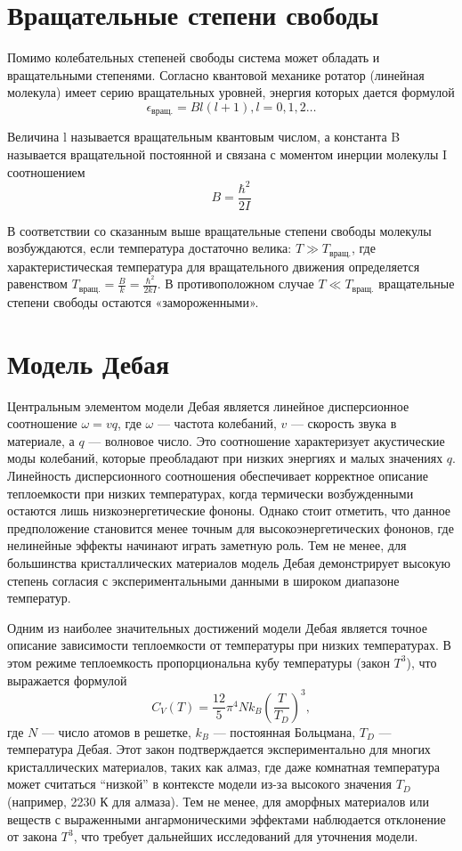 \documentclass[a4paper]{article}
\begin{document}
\section{Вращательные степени свободы}

Помимо колебательных степеней свободы система может обладать
и вращательными степенями. Согласно квантовой механике ротатор
(линейная молекула) имеет серию вращательных уровней, энергия
которых дается формулой
\[\epsilon_{\text{вращ.}}= Bl(l+1), l=0,1,2 \dots\]

Величина l называется вращательным квантовым числом, а константа B называется вращательной постоянной и связана с моментом
инерции молекулы I соотношением
\[B = \frac{\hbar^{2}}{2I}\]

В соответствии со сказанным выше вращательные степени свободы молекулы возбуждаются, если температура достаточно 
велика: $T\gg T_{\text{вращ.}}$, где характеристическая температура для вращательного
движения определяется равенством $T_{\text{вращ.}} = \frac{B}{k}=\frac{\hbar^{2}}{2kI}$. В противоположном случае  $T\ll T_{\text{вращ.}}$ вращательные степени свободы остаются
«замороженными».

\section{Модель Дебая}

Центральным элементом модели Дебая является линейное дисперсионное соотношение $\omega = vq$, где $\omega$ — частота колебаний, $v$ — скорость звука в материале, а $q$ — волновое число. Это соотношение характеризует акустические моды колебаний, которые преобладают при низких энергиях и
малых значениях $q$. Линейность дисперсионного соотношения обеспечивает корректное описание теплоемкости при низких температурах, когда термически возбужденными остаются лишь низкоэнергетические фононы. Однако стоит отметить, что данное предположение становится менее точным для высокоэнергетических фононов, где нелинейные эффекты начинают играть заметную роль. Тем не менее, для большинства кристаллических материалов модель Дебая демонстрирует высокую степень согласия с экспериментальными данными в широком диапазоне температур.

Одним из наиболее значительных достижений модели Дебая является точное описание зависимости теплоемкости от температуры при низких температурах. В этом режиме теплоемкость пропорциональна кубу температуры (закон $T^3$), что выражается формулой
\[
C_V(T) = \frac{12}{5}\pi^4 N k_B \left(\frac{T}{T_D}\right)^3,
\]
где $N$ — число атомов в решетке, $k_B$ — постоянная Больцмана, $T_D$ — температура Дебая. Этот закон подтверждается экспериментально для многих кристаллических материалов, таких
как алмаз, где даже комнатная температура может считаться ``низкой'' в контексте модели из-за высокого значения $T_D$ (например, 2230 К для алмаза). Тем не менее, для аморфных материалов или веществ с выраженными ангармоническими эффектами наблюдается отклонение от закона $T^3$, что требует дальнейших исследований для уточнения модели.
\end{document}

